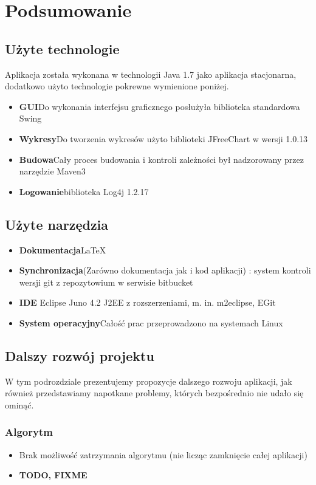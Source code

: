 \documentclass[a4paper,12pt,notitlepage]{mwrep}
\begin{document}
\chapter{Podsumowanie}
\section{Użyte technologie}
Aplikacja została wykonana w technologii Java 1.7
jako aplikacja stacjonarna,
dodatkowo użyto technologie pokrewne wymienione poniżej.
\begin{itemize}
	\item	\textbf{GUI}\quad Do wykonania interfejsu graficznego posłużyła biblioteka standardowa Swing
	\item	\textbf{Wykresy}\quad Do tworzenia wykresów użyto biblioteki JFreeChart w wersji 1.0.13
	\item	\textbf{Budowa}\quad Cały proces budowania i kontroli zależności był nadzorowany przez narzędzie
					Maven3
	\item	\textbf{Logowanie}\quad biblioteka Log4j 1.2.17
\end{itemize}

\section{Użyte narzędzia}
\begin{itemize}
	\item	\textbf{Dokumentacja}\quad \LaTeX
	\item	\textbf{Synchronizacja}\quad (Zarówno dokumentacja jak i kod aplikacji) : system kontroli wersji git
			z repozytowium w serwisie bitbucket
	\item	\textbf{IDE\quad} Eclipse Juno 4.2 J2EE z rozszerzeniami, m. in. m2eclipse, EGit
	\item	\textbf{System operacyjny}\quad Całość prac przeprowadzono na systemach Linux
\end{itemize}

\section{Dalszy rozwój projektu}
W tym podrozdziale prezentujemy propozycje dalszego rozwoju aplikacji, jak również przedstawiamy napotkane problemy, których
bezpośrednio nie udało się ominąć.
\subsection{Algorytm}
\begin{itemize}
	\item	Brak możliwość zatrzymania algorytmu (nie licząc zamknięcie całej aplikacji)
	\item	\textbf{TODO, FIXME}
\end{itemize}
\end{document}
